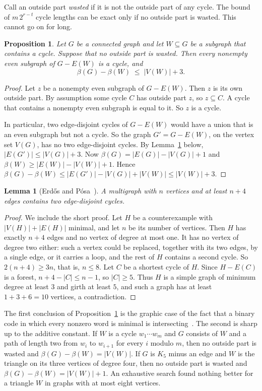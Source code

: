 \documentclass[11pt]{article}
\newtheorem{lemma}[theorem]{Lemma}
\newtheorem{proposition}[theorem]{Proposition}
\theoremstyle{definition}
\theoremstyle{remark}
\begin{document}
Call an outside part \emph{wasted} if it is not the outside part of any cycle. The bound of
$m\,2^{r-t}$ cycle lengths can be exact only if no outside part is wasted. This cannot go on for
long.

\begin{proposition}\label{prop:nowaste}
Let $G$ be a connected graph and let $W\subseteq G$ be a subgraph that contains a cycle. Suppose
that no outside part is wasted. Then every nonempty even subgraph of $G-E(W)$ is a cycle, and
\[
  \beta(G)-\beta(W)\;\le\;|V(W)|+3 .
\]
\end{proposition}

\begin{proof}
Let $z$ be a nonempty even subgraph of $G-E(W)$. Then $z$ is its own outside part. By assumption
some cycle $C$ has outside part $z$, so $z\subseteq C$. A cycle that contains a nonempty even
subgraph is equal to it. So $z$ is a cycle.

In particular, two edge-disjoint cycles of $G-E(W)$ would have a union that is an even subgraph but
not a cycle. So the graph $G'=G-E(W)$, on the vertex set $V(G)$, has no two edge-disjoint cycles.
By Lemma~\ref{lem:EP} below, $|E(G')|\le|V(G)|+3$. Now $\beta(G)=|E(G)|-|V(G)|+1$ and
$\beta(W)\ge|E(W)|-|V(W)|+1$. Hence
$\beta(G)-\beta(W)\le|E(G')|-|V(G)|+|V(W)|\le|V(W)|+3$.
\end{proof}

\begin{lemma}[Erd\H{o}s and P\'osa~\cite{EP}]\label{lem:EP}
A multigraph with $n$ vertices and at least $n+4$ edges contains two edge-disjoint cycles.
\end{lemma}

\begin{proof}
We include the short proof. Let $H$ be a counterexample with $|V(H)|+|E(H)|$ minimal, and let $n$
be its number of vertices. Then $H$ has exactly $n+4$ edges and no vertex of degree at most one. It
has no vertex of degree two either: such a vertex could be replaced, together with its two edges, by
a single edge, or it carries a loop, and the rest of $H$ contains a second cycle. So
$2(n+4)\ge3n$, that is, $n\le8$. Let $C$ be a shortest cycle of $H$. Since $H-E(C)$ is a forest,
$n+4-|C|\le n-1$, so $|C|\ge5$. Thus $H$ is a simple graph of minimum degree at least $3$ and girth
at least $5$, and such a graph has at least $1+3+6=10$ vertices, a contradiction.
\end{proof}

The first conclusion of Proposition~\ref{prop:nowaste} is the graphic case of the fact that a binary
code in which every nonzero word is minimal is intersecting~\cite[\S2]{AACST}. The second is sharp up
to the additive constant. If $W$ is a cycle $w_1\cdots w_m$ and $G$ consists of $W$ and a path of
length two from $w_i$ to $w_{i+1}$ for every $i$ modulo $m$, then no outside part is wasted and
$\beta(G)-\beta(W)=|V(W)|$. If $G$ is $K_5$ minus an edge and $W$ is the triangle on its three
vertices of degree four, then no outside part is wasted and $\beta(G)-\beta(W)=|V(W)|+1$. An exhaustive
search found nothing better for a triangle $W$ in graphs with at most eight vertices.
\end{document}
